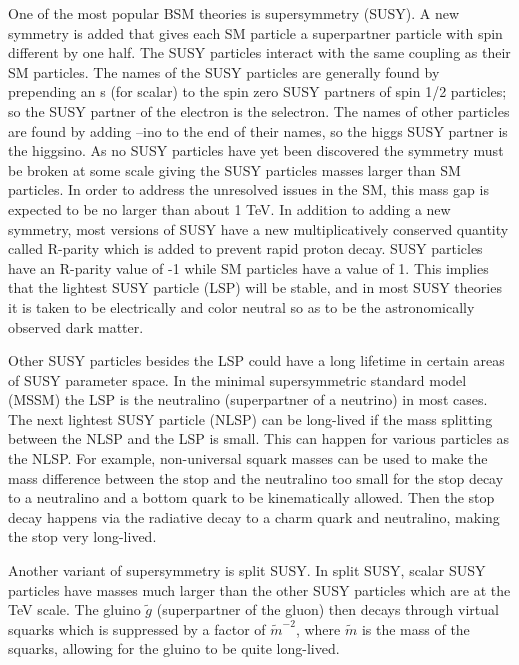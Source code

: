 One of the most popular BSM theories is supersymmetry (SUSY). A new symmetry is added that gives
each SM particle a superpartner particle with spin different by one half. The SUSY particles interact with the same coupling as their SM particles.
The names of the SUSY particles are generally found by prepending an s (for scalar) to the spin zero SUSY partners of spin 1/2 particles;
so the SUSY partner of the electron is the selectron. The names of other particles are found by adding --ino to the end of their names,
so the higgs SUSY partner is the higgsino.
As no SUSY particles have yet been discovered the
symmetry must be broken at some scale giving the SUSY particles masses larger than SM particles. In order to address the unresolved issues in the SM, this mass gap is
expected to be no larger than about 1 TeV. In addition to adding a new symmetry, most versions of SUSY have a new multiplicatively conserved quantity called R-parity
which is added to prevent rapid proton decay.
SUSY particles have an R-parity value of -1 while SM particles have a value of 1. This implies that the lightest SUSY particle (LSP) will be stable, and in most
SUSY theories it is taken to be electrically and color neutral so as to be the astronomically observed dark matter.

Other SUSY particles besides the LSP could have a long lifetime in certain areas of SUSY parameter space. In the minimal supersymmetric standard model (MSSM) the LSP is the
neutralino (superpartner of a neutrino) in most cases. The next lightest SUSY particle (NLSP) can be long-lived if the mass splitting between the NLSP and the LSP is small.
This can happen for various particles as the NLSP. 
For example, non-universal squark masses can be used to make the mass difference between the stop and the neutralino too small for the stop decay to a neutralino and
a bottom quark to be kinematically allowed.
Then the stop decay happens via the radiative decay to a charm quark and neutralino, making the stop very long-lived.

Another variant of supersymmetry is split SUSY. In split SUSY, scalar SUSY particles have masses much larger than the other SUSY particles which are at the TeV scale.
The gluino $\tilde{g}$ (superpartner of the gluon) then decays through virtual squarks which 
is suppressed by a factor of $\tilde{m}^{-2}$, where $\tilde{m}$ is the mass of the squarks, allowing for the gluino to be quite long-lived.

